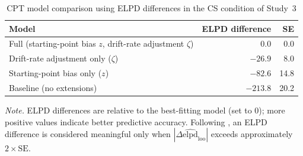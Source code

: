 \documentclass[man,floatsintext]{apa7}
\begin{document}
\begin{table}[!htbp]
\centering
\begin{threeparttable}\small
\caption{CPT model comparison using ELPD differences in the CS condition of Study~3}
\label{tab:cpt_mc_cs_study3}
\begin{tabularx}{\linewidth}{@{} >{\raggedright\arraybackslash}X rr @{}}
\toprule
\textbf{Model} & \textbf{ELPD difference} & \textbf{SE} \\
\midrule
Full (starting-point bias $z$, drift-rate adjustment $\zeta$) & 0.0 & 0.0 \\
Drift-rate adjustment only ($\zeta$) & $-26.9$ & 8.0 \\
Starting-point bias only ($z$) & $-82.6$ & 14.8 \\
Baseline (no extensions) & $-213.8$ & 20.2 \\
\bottomrule
\end{tabularx}
\begin{tablenotes}
\item \textit{Note.} ELPD differences are relative to the best-fitting model (set to 0); more positive values indicate better predictive accuracy. Following \textcite{vehtari_practical_2017}, an ELPD difference is considered meaningful only when $|\Delta\widehat{\mathrm{elpd}}_{\mathrm{loo}}|$ exceeds approximately $2 \times \mathrm{SE}$. 
\end{tablenotes}
\end{threeparttable}
\end{table}
\end{document}
